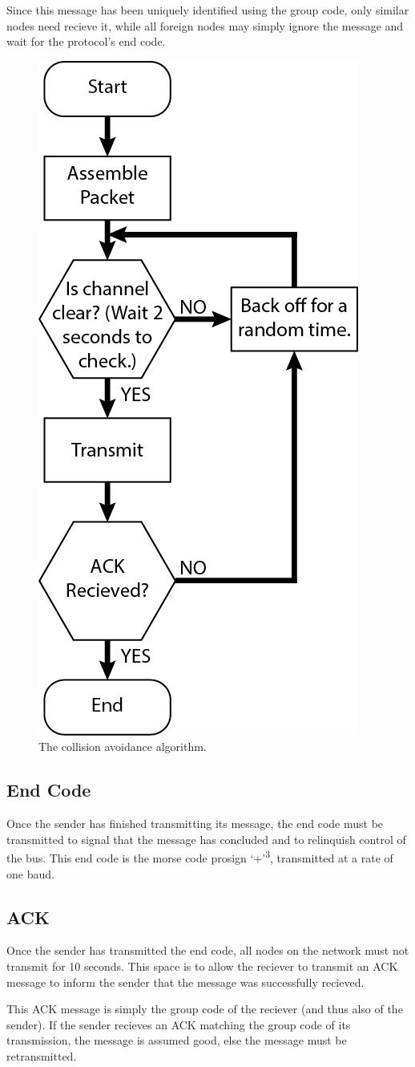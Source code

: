 Since this message has been uniquely identified using the group code, only similar nodes need recieve it, while all foreign nodes may simply ignore the message and wait for the protocol's end code.

\begin{figure}
\vspace{-40pt}
\centering
\includegraphics[width=.3\textwidth]{CSMA_Flow.png}
\caption{The collision avoidance algorithm.}
\label{fig:CSMA}
\end{figure}


\subsection{End Code}

Once the sender has finished transmitting its message, the end code must be transmitted to signal that the message has concluded and to relinquish control of the bus. This end code is the morse code prosign `+'\textsuperscript{3}, transmitted at a rate of one baud.

\subsection{ACK}


Once the sender has transmitted the end code, all nodes on the network must not transmit for 10 seconds. This space is to allow the reciever to transmit an ACK message to inform the sender that the message was successfully recieved.

This ACK message is simply the group code of the reciever (and thus also of the sender). If the sender recieves an ACK matching the group code of its transmission, the message is assumed good, else the message must be retransmitted.

